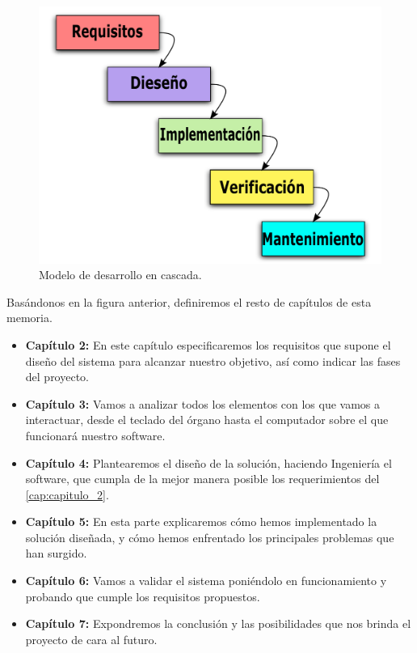 \begin{figure}[H]
	\noindent \begin{centering}
		\includegraphics[width=\linewidth/2]{capitulo1/figura12}
		\par\end{centering}
	\smallskip
	\caption{\label{fig:figura12} Modelo de desarrollo en cascada.}
\end{figure} 

\smallskip

Basándonos en la figura anterior, definiremos el resto de capítulos de esta memoria.

\begin{itemize}

\item \textbf{Capítulo 2:} En este capítulo especificaremos los requisitos que supone el diseño del sistema para alcanzar nuestro objetivo, así como indicar las fases del proyecto.

\item \textbf{Capítulo 3:} Vamos a analizar todos los elementos con los que vamos a interactuar, desde el teclado del órgano hasta el computador sobre el que funcionará nuestro software. 

\item \textbf{Capítulo 4:} Plantearemos el diseño de la solución, haciendo Ingeniería el software, que cumpla de la mejor manera posible los requerimientos del \ref{cap:capitulo_2}.

\item \textbf{Capítulo 5:} En esta parte explicaremos cómo hemos implementado la solución diseñada, y cómo hemos enfrentado los principales problemas que han surgido.

\item \textbf{Capítulo 6:} Vamos a validar el sistema poniéndolo en funcionamiento y probando que cumple los requisitos propuestos.

\item \textbf{Capítulo 7:} Expondremos la conclusión y las posibilidades que nos brinda el proyecto de cara al futuro.
  
\end{itemize}

\newpage
\clearpage{\pagestyle{empty}\cleardoublepage}
